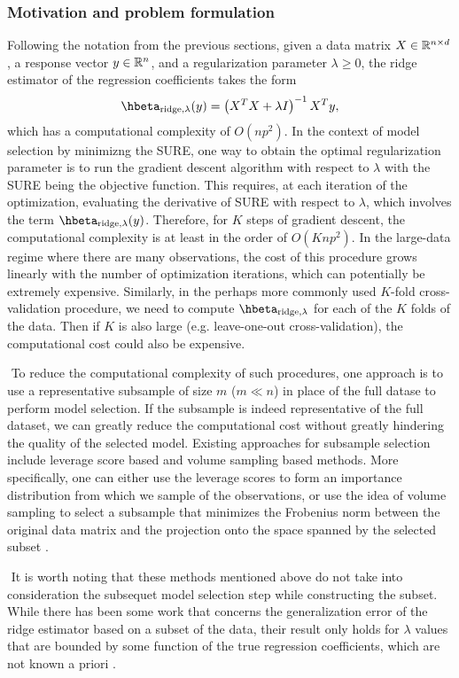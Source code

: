 \subsubsection{Motivation and problem formulation}
Following the notation from the previous sections, given a data matrix $X\in\mathbb{R}^{n\times d}$, a response vector $y\in\mathbb{R}^n$, and a regularization parameter $\lambda\geq0$, the ridge estimator of the regression coefficients takes the form
\[
\hbeta_{\text{ridge}, \lambda}(y) = \left( X^TX + \lambda I \right)^{-1}X^Ty,
\]
which has a computational complexity of $O(np^2)$. In the context of model selection by minimizng the SURE, one way to obtain the optimal regularization parameter is to run the gradient descent algorithm with respect to $\lambda$ with the SURE being the objective function. This requires, at each iteration of the optimization, evaluating the derivative of SURE with respect to $\lambda$, which involves the term $\hbeta_{\text{ridge}, \lambda}(y)$. Therefore, for $K$ steps of gradient descent, the computational complexity is at least in the order of $O(Knp^2)$. In the large-data regime where there are many observations, the cost of this procedure grows linearly with the number of optimization iterations, which can potentially be extremely expensive. Similarly, in the perhaps more commonly used $K$-fold cross-validation procedure, we need to compute $\hbeta_{\text{ridge}, \lambda}$ for each of the $K$ folds of the data. Then if $K$ is also large (e.g. leave-one-out cross-validation), the computational cost could also be expensive.

$ $\newline
To reduce the computational complexity of such procedures, one approach is to use a representative subsample of size $m$ ($m\ll n$) in place of the full datase to perform model selection. If the subsample is indeed representative of the full dataset, we can greatly reduce the computational cost without greatly hindering the quality of the selected model. Existing approaches for subsample selection include leverage score based and volume sampling based methods. More specifically, one can either use the leverage scores to form an importance distribution from which we sample of the observations, or use the idea of volume sampling to select a subsample that minimizes the Frobenius norm between the original data matrix and the projection onto the space spanned by the selected subset \citep{ma2014statistical,avron2010blendenpik}.

$ $\newline
It is worth noting that these methods mentioned above do not take into consideration the subsequet model selection step while constructing the subset. While there has been some work that concerns the generalization error of the ridge estimator based on a subset of the data, their result only holds for $\lambda$ values that are bounded by some function of the true regression coefficients, which are not known a priori \citep{derezinski2017subsampling}.
